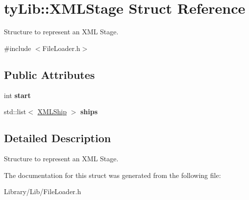 \hypertarget{structty_lib_1_1_x_m_l_stage}{}\section{ty\+Lib\+:\+:X\+M\+L\+Stage Struct Reference}
\label{structty_lib_1_1_x_m_l_stage}


Structure to represent an X\+M\+L Stage.  




{\ttfamily \#include $<$File\+Loader.\+h$>$}

\subsection*{Public Attributes}
\begin{DoxyCompactItemize}
\item 
\hypertarget{structty_lib_1_1_x_m_l_stage_abcbac2bfcebfd065ff9096bd10f72361}{}int {\bfseries start}\label{structty_lib_1_1_x_m_l_stage_abcbac2bfcebfd065ff9096bd10f72361}

\item 
\hypertarget{structty_lib_1_1_x_m_l_stage_a9afcb121cfc64d76cf4295fb2de026a8}{}std\+::list$<$ \hyperlink{structty_lib_1_1_x_m_l_ship}{X\+M\+L\+Ship} $>$ {\bfseries ships}\label{structty_lib_1_1_x_m_l_stage_a9afcb121cfc64d76cf4295fb2de026a8}

\end{DoxyCompactItemize}


\subsection{Detailed Description}
Structure to represent an X\+M\+L Stage. 

The documentation for this struct was generated from the following file\+:\begin{DoxyCompactItemize}
\item 
Library/\+Lib/File\+Loader.\+h\end{DoxyCompactItemize}
